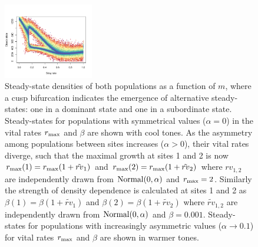 \documentclass{revtex4}
\begin{document}
\begin{figure}
  \captionsetup{justification=raggedright,
singlelinecheck=false
}
\centering
\includegraphics[width=0.35\textwidth]{fig_asymdensity.pdf}
\caption{
Steady-state densities of both populations as a function of $m$, where a cusp bifurcation indicates the emergence of alternative steady-states: one in a dominant state and one in a subordinate state.
Steady-states for populations with symmetrical values ($\alpha=0$) in the vital rates $r_{\rm max}$ and $\beta$ are shown with cool tones.
As the asymmetry among populations between sites increases ($\alpha>0$), their vital rates diverge, such that the maximal growth at sites 1 and 2 is now $r_{\rm max}(1)=r_{\rm max}(1+\tilde{rv}_1)$ and $r_{\rm max}(2)=r_{\rm max}(1+\tilde{rv}_2)$ where $rv_{1,2}$ are independently drawn from $\rm{Normal}(0,\alpha)$ and $r_{\rm max}=2$. 
Similarly the strength of density dependence is calculated at sites 1 and 2 as $\beta(1)=\beta(1+\tilde{rv}_1)$ and $\beta(2)=\beta(1+\tilde{rv}_2)$ where $\tilde{rv}_{1,2}$ are independently drawn from $\rm{Normal}(0,\alpha)$ and $\beta=0.001$.
Steady-states for populations with increasingly asymmetric values ($\alpha\rightarrow 0.1$) for vital rates $r_{\rm max}$ and $\beta$ are shown in warmer tones.
} \label{fig:symmetry}
\end{figure}
\end{document}
